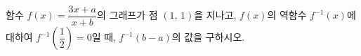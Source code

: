 \hspace*{2mm}\begin{minipage}[t]{\dimexpr\linewidth-2mm\relax}\vspace{0pt}
함수 $f(x)=\dfrac{3x+a}{x+b}$의 그래프가 점 $(1,\,1)$을 지나고, $f(x)$의 역함수 $f^{-1}(x)$에 대하여 $f^{-1}\!\left(\dfrac{1}{2}\right)=0$일 때, $f^{-1}(b-a)$의 값을 구하시오. \end{minipage}
